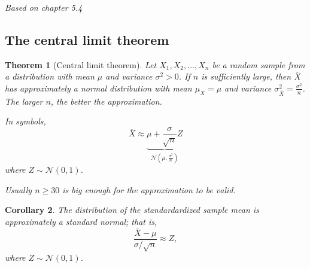 \documentclass[10pt]{article}
\newtheorem{theorem}{Theorem}
\newtheorem{corollary}[theorem]{Corollary}
\theoremstyle{definition}
\newcommand{\1}[1]{\textbf{1}_{\left[#1\right]}} %
\begin{document}
\textit{Based on chapter 5.4}

\subsection{The central limit theorem}

\begin{theorem}[Central limit theorem]
  \label{thm:central-limit-theorem}
  Let $X_{1},X_{2},\ldots,X_{n}$ be a random sample from a distribution with
  mean $\mu$ and variance $\sigma^{2}>0$. If $n$ is sufficiently large, then
  $\overline{X}$ has approximately a normal distribution with mean
  $\mu_{\overline{X}}=\mu$ and variance
  $\sigma^{2}_{\overline{X}}= \frac{\sigma^{2}}{n}$. The larger $n$, the
  better the approximation.

  In symbols,
  \begin{equation}\label{eq:20}
    \overline{X} \approx \underbrace{\mu + \frac{\sigma}{\sqrt{n}}Z}_{\mathcal{N}(\mu, \frac{\sigma^{2}}{n})}
  \end{equation}
  where $Z\sim \mathcal{N}(0,1)$. 

  Usually $n \geq 30$ is big enough for the approximation to be valid.
\end{theorem}

\begin{corollary}
  The distribution of the standardardized sample mean is approximately a
  standard normal; that is,
  \begin{equation}\label{eq:4}
    \frac{\overline{X}-\mu}{\sigma/\sqrt{n}} \approx Z,
  \end{equation}
  where $Z\sim \mathcal{N}(0,1)$.
\end{corollary}
\end{document}
